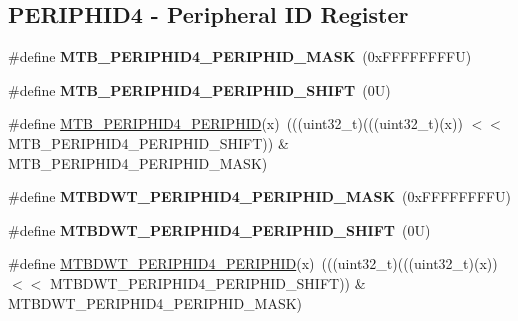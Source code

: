 \subsection*{P\+E\+R\+I\+P\+H\+I\+D4 -\/ Peripheral ID Register}
\begin{DoxyCompactItemize}
\item 
\mbox{\label{group___m_t_b___register___masks_gae2bbe3776020c18f81e307562dc29add}} 
\#define {\bfseries M\+T\+B\+\_\+\+P\+E\+R\+I\+P\+H\+I\+D4\+\_\+\+P\+E\+R\+I\+P\+H\+I\+D\+\_\+\+M\+A\+SK}~(0x\+F\+F\+F\+F\+F\+F\+F\+F\+U)
\item 
\mbox{\label{group___m_t_b___register___masks_ga2f8c532d211d58d5a837aaf1b9b03d20}} 
\#define {\bfseries M\+T\+B\+\_\+\+P\+E\+R\+I\+P\+H\+I\+D4\+\_\+\+P\+E\+R\+I\+P\+H\+I\+D\+\_\+\+S\+H\+I\+FT}~(0\+U)
\item 
\#define \mbox{\hyperlink{group___m_t_b___register___masks_ga27a085dd9308f93405769df32d7a5eeb}{M\+T\+B\+\_\+\+P\+E\+R\+I\+P\+H\+I\+D4\+\_\+\+P\+E\+R\+I\+P\+H\+ID}}(x)~(((uint32\+\_\+t)(((uint32\+\_\+t)(x)) $<$$<$ M\+T\+B\+\_\+\+P\+E\+R\+I\+P\+H\+I\+D4\+\_\+\+P\+E\+R\+I\+P\+H\+I\+D\+\_\+\+S\+H\+I\+FT)) \& M\+T\+B\+\_\+\+P\+E\+R\+I\+P\+H\+I\+D4\+\_\+\+P\+E\+R\+I\+P\+H\+I\+D\+\_\+\+M\+A\+SK)
\item 
\mbox{\label{group___m_t_b___register___masks_gaddd57001bd456b2dd9720666e79a6a9e}} 
\#define {\bfseries M\+T\+B\+D\+W\+T\+\_\+\+P\+E\+R\+I\+P\+H\+I\+D4\+\_\+\+P\+E\+R\+I\+P\+H\+I\+D\+\_\+\+M\+A\+SK}~(0x\+F\+F\+F\+F\+F\+F\+F\+F\+U)
\item 
\mbox{\label{group___m_t_b___register___masks_gae4c40c829668a2b26905df906a978e6a}} 
\#define {\bfseries M\+T\+B\+D\+W\+T\+\_\+\+P\+E\+R\+I\+P\+H\+I\+D4\+\_\+\+P\+E\+R\+I\+P\+H\+I\+D\+\_\+\+S\+H\+I\+FT}~(0\+U)
\item 
\#define \mbox{\hyperlink{group___m_t_b___register___masks_gafedb60fc72cfa242897fccc521c0ba14}{M\+T\+B\+D\+W\+T\+\_\+\+P\+E\+R\+I\+P\+H\+I\+D4\+\_\+\+P\+E\+R\+I\+P\+H\+ID}}(x)~(((uint32\+\_\+t)(((uint32\+\_\+t)(x)) $<$$<$ M\+T\+B\+D\+W\+T\+\_\+\+P\+E\+R\+I\+P\+H\+I\+D4\+\_\+\+P\+E\+R\+I\+P\+H\+I\+D\+\_\+\+S\+H\+I\+FT)) \& M\+T\+B\+D\+W\+T\+\_\+\+P\+E\+R\+I\+P\+H\+I\+D4\+\_\+\+P\+E\+R\+I\+P\+H\+I\+D\+\_\+\+M\+A\+SK)
\item 

\end{DoxyCompactItemize}
